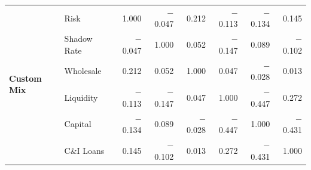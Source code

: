 \documentclass[12pt,a4paper]{report}\usepackage[a4paper, top=2.5cm, bottom=2.5cm, left=2.5cm, right=2.5cm]{geometry}
\begin{document}
\begin{table}[H]
{\begin{tabular}{ll rrrrrr}
\multirow{6}{*}{\textbf{Custom Mix}}
 & Risk          &  1.000 & $-$0.047 &  0.212 & $-$0.113 & $-$0.134 &  0.145 \\
 & Shadow Rate   & $-$0.047 &  1.000 &  0.052 & $-$0.147 &  0.089 & $-$0.102 \\
 & Wholesale     &  0.212 &  0.052 &  1.000 &  0.047 & $-$0.028 &  0.013 \\
 & Liquidity     & $-$0.113 & $-$0.147 &  0.047 &  1.000 & $-$0.447 &  0.272 \\
 & Capital       & $-$0.134 &  0.089 & $-$0.028 & $-$0.447 &  1.000 & $-$0.431 \\
 & C\&I Loans    &  0.145 & $-$0.102 &  0.013 &  0.272 & $-$0.431 &  1.000 \\

\bottomrule
\end{tabular}%
}
\end{table}

\end{document}
